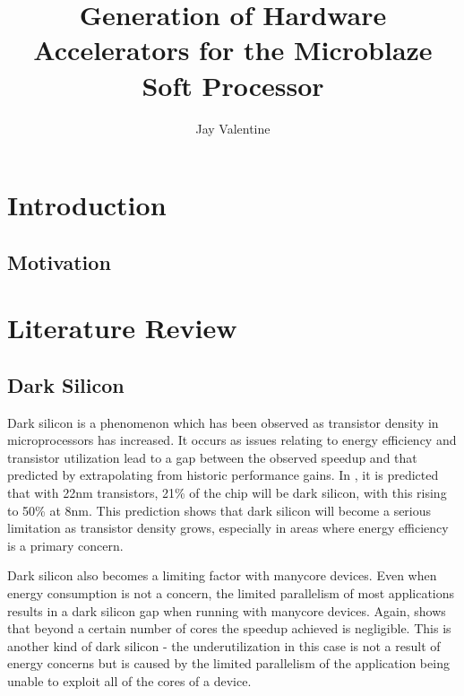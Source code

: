 \documentclass{UoYCSproject}
\begin{document}
\title{Generation of Hardware Accelerators for the Microblaze Soft Processor}
\author{Jay Valentine}

\maketitle

\begin{abstract}
\end{abstract}

\chapter{Introduction}

\section{Motivation}

\chapter{Literature Review}

\section{Dark Silicon}

Dark silicon is a phenomenon which has been observed as transistor density in microprocessors has increased.
It occurs as issues relating to energy efficiency and transistor utilization lead to a gap between the
observed speedup and that predicted by extrapolating from historic performance gains.
In \cite{darksilicon}, it is predicted that with 22nm transistors, 21\% of the chip will be dark silicon,
with this rising to 50\% at 8nm. This prediction shows that dark silicon will become a serious limitation
as transistor density grows, especially in areas where energy efficiency is a primary concern.

Dark silicon also becomes a limiting factor with manycore devices. Even when energy consumption is not a
concern, the limited parallelism of most applications results in a dark silicon gap when running with
manycore devices. Again, \cite{darksilicon} shows that beyond a certain number of cores the speedup achieved
is negligible. This is another kind of dark silicon - the underutilization in this case is not a result of
energy concerns but is caused by the limited parallelism of the application being unable to exploit all of
the cores of a device.
\end{document}
